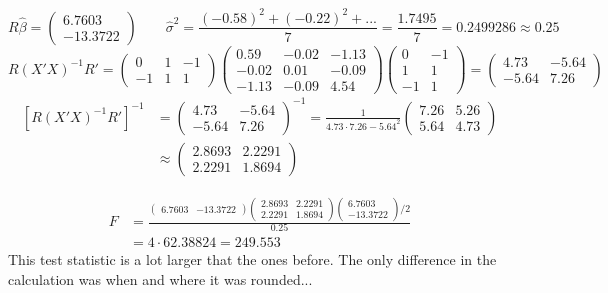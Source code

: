 \documentclass[captions=tableheading, 12pt, headings=small, parskip=half]{scrartcl}
\begin{document}
\begin{enumerate}[label = \alph*)]
{\[	\]
	\[
		R\hat{\beta} = \begin{pmatrix}6.7603\\-13.3722\end{pmatrix} \qquad \hat{\sigma}^2 = \frac{(-0.58)^2 + (-0.22)^2 + ...}{7} = \frac{1.7495}{7} = 0.2499286 \approx 0.25
	\]
	\[
		R(X'X)^{-1}R' = \begin{pmatrix}0&1&-1\\-1&1&1\end{pmatrix} \begin{pmatrix}
		0.59 & -0.02 & -1.13 \\ 
		-0.02 & 0.01 & -0.09 \\ 
		-1.13 & -0.09 & 4.54%
		\end{pmatrix} \begin{pmatrix} 0&-1\\1&1\\-1&1 \end{pmatrix} = \begin{pmatrix}4.73 & -5.64\\-5.64&7.26\end{pmatrix}
	\]
	\begin{align*}
		\left[R(X'X)^{-1}R'\right]^{-1} &= \begin{pmatrix}4.73 & -5.64\\-5.64&7.26\end{pmatrix}^{-1} = \frac{1}{4.73\cdot 7.26 - 5.64^2}\begin{pmatrix}7.26 & 5.26 \\ 5.64 & 4.73\end{pmatrix}\\
		&\approx \begin{pmatrix}2.8693&2.2291\\2.2291&1.8694\end{pmatrix}
	\end{align*}

	\begin{align*}
		F &= \frac{\begin{pmatrix}6.7603 & -13.3722\end{pmatrix} \begin{pmatrix} 2.8693 & 2.2291 \\ 2.2291 & 1.8694 \end{pmatrix} \begin{pmatrix} 6.7603 \\ -13.3722 \end{pmatrix} / 2}{0.25}\\
		&= 4\cdot 62.38824 = 249.553
	\end{align*}
	This test statistic is a lot larger that the ones before. The only difference in the calculation was when and where it was rounded...
}
\end{enumerate}
\end{document}

